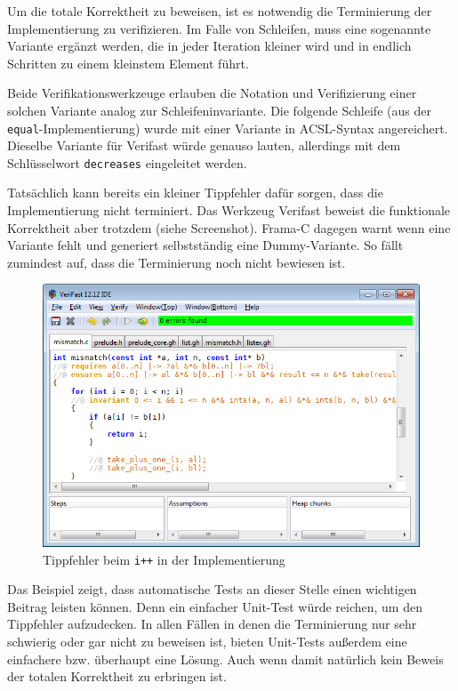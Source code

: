 Um die totale Korrektheit zu beweisen, ist es notwendig die Terminierung der Implementierung zu
verifizieren. Im Falle von Schleifen, muss eine sogenannte Variante ergänzt werden, die
in jeder Iteration kleiner wird und in endlich Schritten zu einem kleinstem Element führt.

Beide Verifikationswerkzeuge erlauben die Notation und Verifizierung einer solchen Variante analog zur
Schleifeninvariante. Die folgende Schleife (aus der \texttt{equal}-Implementierung) wurde mit einer Variante 
in ACSL-Syntax angereichert. Dieselbe Variante für Verifast würde genauso lauten, allerdings
mit dem Schlüsselwort \texttt{decreases} eingeleitet werden.
\begin{figure}[H]

\end{figure}

Tatsächlich kann bereits ein kleiner Tippfehler dafür sorgen, dass die Implementierung
nicht terminiert. Das Werkzeug Verifast beweist die funktionale Korrektheit aber trotzdem
(siehe Screenshot). Frama-C dagegen warnt wenn eine Variante fehlt und generiert selbstständig
eine Dummy-Variante. So fällt zumindest auf, dass die Terminierung noch nicht bewiesen ist.

\begin{figure}[H]
	\centering
\includegraphics[width=1.0\textwidth]{images/verifast-partial-correctness.png}
\caption{Tippfehler beim \texttt{i++} in der Implementierung}
\end{figure}

Das Beispiel zeigt, dass automatische Tests an dieser Stelle einen wichtigen Beitrag leisten
können. Denn ein einfacher Unit-Test würde reichen, um den Tippfehler aufzudecken. In allen
Fällen in denen die Terminierung nur sehr schwierig oder gar nicht zu beweisen ist, bieten
Unit-Tests außerdem eine einfachere bzw. überhaupt eine Lösung. Auch wenn damit natürlich
kein Beweis der totalen Korrektheit zu erbringen ist.


